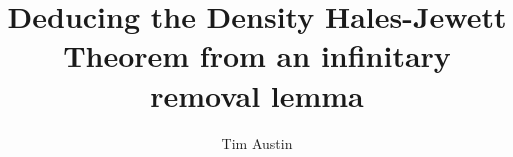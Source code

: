 \documentclass[11pt]{article}
\begin{document}
\title{\textbf{Deducing the Density Hales-Jewett Theorem from an infinitary removal lemma}}
\author{Tim Austin}
\date{}

\maketitle


\newenvironment{nmath}{\begin{center}\begin{math}}{\end{math}\end{center}}

\newtheorem{thm}{Theorem}[section]
\newtheorem*{thm*}{Theorem}
\newtheorem{lem}[thm]{Lemma}
\newtheorem{prop}[thm]{Propoisition}
\newtheorem{cor}[thm]{Corollary}
\newtheorem*{conj*}{Conjecture}
\newtheorem{dfn}[thm]{Definition}
\newtheorem{ques}[thm]{Question}
\theoremstyle{remark}


\newcommand{\A}{\mathcal{A}}
\newcommand{\B}{\mathcal{B}}
\newcommand{\I}{\mathcal{I}}
\newcommand{\frH}{\mathfrak{H}}
\renewcommand{\Pr}{\mathrm{Pr}}
\newcommand{\s}{\sigma}
\renewcommand{\P}{\mathcal{P}}
\renewcommand{\O}{\Omega}
\renewcommand{\o}{\omega}
\renewcommand{\S}{\Sigma}
\newcommand{\T}{\mathrm{T}}
\newcommand{\co}{\mathrm{co}}
\newcommand{\e}{\mathrm{e}}
\newcommand{\eps}{\varepsilon}
\renewcommand{\d}{\mathrm{d}}
\newcommand{\im}{\mathrm{i}}
\renewcommand{\l}{\lambda}
\newcommand{\U}{\mathcal{U}}
\newcommand{\G}{\Gamma}
\newcommand{\g}{\gamma}
\newcommand{\calL}{\mathcal{L}}
\renewcommand{\L}{\Lambda}
\newcommand{\hcf}{\mathrm{hcf}}
\newcommand{\FLat}{\mathrm{FLat}}
\newcommand{\F}{\mathcal{F}}
\renewcommand{\a}{\alpha}
\newcommand{\bbN}{\mathbb{N}}
\newcommand{\bbR}{\mathbb{R}}
\newcommand{\bbZ}{\mathbb{Z}}
\newcommand{\bbQ}{\mathbb{Q}}
\newcommand{\bbT}{\mathbb{T}}
\newcommand{\sfE}{\mathsf{E}}
\newcommand{\sfP}{\mathsf{P}}
\newcommand{\id}{\mathrm{id}}
\newcommand{\bb}[1]{\mathbb{#1}}
\newcommand{\fr}[1]{\mathfrak{#1}}
\renewcommand{\bf}[1]{\mathbf{#1}}
\renewcommand{\rm}[1]{\mathrm{#1}}
\renewcommand{\cal}[1]{\mathcal{#1}}
\newcommand{\fin}{\nolinebreak\hspace{\stretch{1}}$\lhd$}
\newcommand{\uhr}{\!\!\upharpoonright}

\newcommand{\into}{\hookrightarrow}

\renewcommand{\line}{\mathrm{line}}

\parskip 7pt
\end{document}

